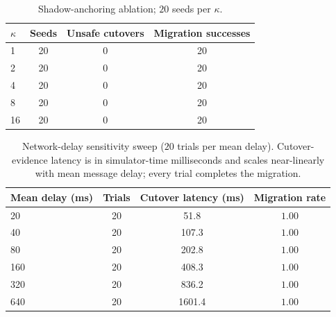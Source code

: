\documentclass[journal]{IEEEtran}
\theoremstyle{definition}
\theoremstyle{remark}
\begin{document}
\begin{table}[t]
\centering
\caption{Shadow-anchoring ablation; $20$ seeds per $\kappa$.}
\label{tab:appabl}
\setlength{\tabcolsep}{5pt}\renewcommand{\arraystretch}{1.15}\footnotesize
\begin{tabular}{lccc}
\toprule
$\kappa$ & Seeds & Unsafe cutovers & Migration successes \\
\midrule
1  & 20 & 0 & 20 \\
2  & 20 & 0 & 20 \\
4  & 20 & 0 & 20 \\
8  & 20 & 0 & 20 \\
16 & 20 & 0 & 20 \\
\bottomrule
\end{tabular}
\end{table}

\begin{table}[t]
\centering
\caption{Network-delay sensitivity sweep
($20$ trials per mean delay). Cutover-evidence latency is in simulator-time milliseconds and scales
near-linearly with mean message delay; every trial completes the migration.}
\label{tab:appsens}
\setlength{\tabcolsep}{5pt}\renewcommand{\arraystretch}{1.15}\footnotesize
\begin{tabular}{lccc}
\toprule
Mean delay (ms) & Trials & Cutover latency (ms) & Migration rate \\
\midrule
20  & 20 & 51.8 & $1.00$ \\
40  & 20 & 107.3 & $1.00$ \\
80  & 20 & 202.8 & $1.00$ \\
160 & 20 & 408.3 & $1.00$ \\
320 & 20 & 836.2 & $1.00$ \\
640 & 20 & 1601.4 & $1.00$ \\
\bottomrule
\end{tabular}
\end{table}
\end{document}
